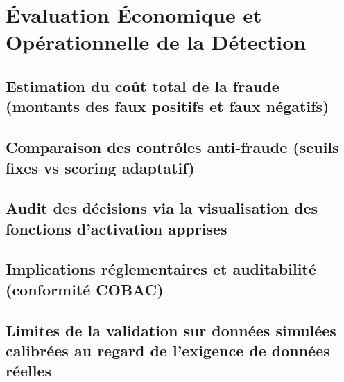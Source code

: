 \documentclass[11pt,a4paper,oneside]{report}
\theoremstyle{definition}
\theoremstyle{remark}
\begin{document}
\chapter{Évaluation Économique et Opérationnelle de la Détection}

\section{Estimation du coût total de la fraude (montants des faux positifs et faux négatifs)}

\section{Comparaison des contrôles anti-fraude (seuils fixes vs scoring adaptatif)}

\section{Audit des décisions via la visualisation des fonctions d'activation apprises}

\section{Implications réglementaires et auditabilité (conformité COBAC)}

\section{Limites de la validation sur données simulées calibrées au regard de l'exigence de données réelles}
\end{document}
